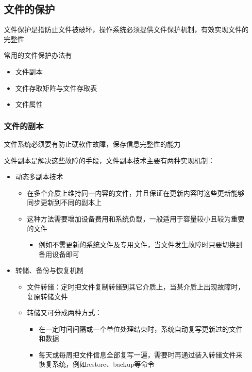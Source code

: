 \documentclass[cs4size,a4paper,10pt]{ctexart}
\begin{document}
	\subsection{文件的保护}
	文件保护是指防止文件被破坏，操作系统必须提供文件保护机制，有效实现文件的完整性

	常用的文件保护办法有
	\begin{itemize}
		\item 文件副本
		\item 文件存取矩阵与文件存取表
		\item 文件属性
	\end{itemize}

	\subsubsection{文件的副本}
	文件系统必须要有防止硬软件故障，保存信息完整性的能力

	文件副本是解决这些故障的手段，文件副本技术主要有两种实现机制：
	\begin{itemize}
		\item 动态多副本技术
		\begin{itemize}
			\item 在多个介质上维持同一内容的文件，并且保证在更新内容时这些更新能够同步更新到不同的副本上
			\item 这种方法需要增加设备费用和系统负载，一般适用于容量较小且较为重要的文件
			\begin{itemize}
				\item 例如不需更新的系统文件及专用文件，当文件发生故障时只要切换到备用设备即可
			\end{itemize}
		\end{itemize}
		\item 转储、备份与恢复机制
		\begin{itemize}
			\item 文件转储：定时把文件复制转储到其它介质上，当某介质上出现故障时，复原转储文件
			\item 转储又可分成两种方式：
			\begin{itemize}
				\item 在一定时间间隔或一个单位处理结束时，系统自动复写更新过的文件和数据
				\item 每天或每周把文件信息全部复写一遍，需要时再通过装入转储文件来恢复系统，例如restore、backup等命令
			\end{itemize}
		\end{itemize}
	\end{itemize}
\end{document}
